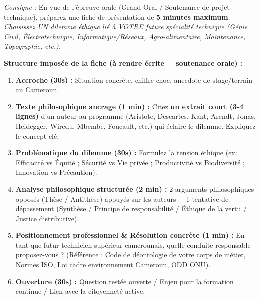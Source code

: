\documentclass[11pt]{article}
\newcommand{\cle}[1]{{\popxbold\color{popdark}#1}}
\begin{document}
\begin{exercice}
\emph{Consigne :} En vue de l'épreuve orale (Grand Oral / Soutenance de projet technique), préparez une fiche de présentation de \textbf{5 minutes maximum}.
\emph{Choisissez UN dilemme éthique lié à VOTRE future spécialité technique (Génie Civil, Électrotechnique, Informatique/Réseaux, Agro-alimentaire, Maintenance, Topographie, etc.).}

\textbf{Structure imposée de la fiche (à rendre écrite + soutenance orale) :}
\begin{enumerate}
    \item \textbf{Accroche (30s) :} Situation concrète, chiffre choc, anecdote de stage/terrain au Cameroun.
    \item \textbf{Texte philosophique ancrage (1 min) :} Citez \textbf{un extrait court (3-4 lignes)} d'un auteur au programme (Aristote, Descartes, Kant, Arendt, Jonas, Heidegger, Wiredu, Mbembe, Foucault, etc.) qui éclaire le dilemme. Expliquez le concept clé.
    \item \textbf{Problématique du dilemme (30s) :} Formulez la tension éthique (ex: Efficacité vs Équité ; Sécurité vs Vie privée ; Productivité vs Biodiversité ; Innovation vs Précaution).
    \item \textbf{Analyse philosophique structurée (2 min) :} 2 arguments philosophiques opposés (Thèse / Antithèse) appuyés sur les auteurs + 1 tentative de dépassement (Synthèse / Principe de responsabilité / Éthique de la vertu / Justice distributive).
    \item \textbf{Positionnement professionnel \& Résolution concrète (1 min) :} En tant que futur technicien supérieur camerounais, quelle \cle{conduite responsable} proposez-vous ? (Référence : Code de déontologie de votre corps de métier, Normes ISO, Loi cadre environnement Cameroun, ODD ONU).
    \item \textbf{Ouverture (30s) :} Question restée ouverte / Enjeu pour la formation continue / Lien avec la citoyenneté active.
\end{enumerate}


\end{exercice}
\end{document}
